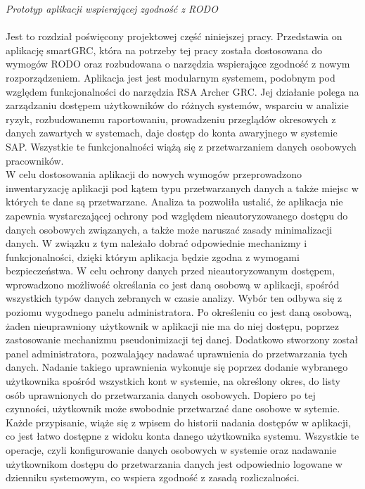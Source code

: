 \documentclass[en, noamssymb]{mgr}
\begin{document}
\indent \textit{Prototyp aplikacji wspierającej zgodność z RODO} \\ \\
\indent Jest to rozdział poświęcony projektowej część niniejszej pracy. Przedstawia on aplikację smartGRC, która na potrzeby tej pracy została dostosowana do wymogów RODO oraz rozbudowana o narzędzia wspierające zgodność z nowym rozporządzeniem. Aplikacja jest jest modularnym systemem, podobnym pod względem funkcjonalności do narzędzia RSA Archer GRC. Jej działanie polega na zarządzaniu dostępem użytkowników do różnych systemów, wsparciu w analizie ryzyk, rozbudowanemu raportowaniu, prowadzeniu przeglądów okresowych z danych zawartych w systemach, daje dostęp do konta awaryjnego w systemie SAP. Wszystkie te funkcjonalności wiążą się z przetwarzaniem danych osobowych pracowników. \\
\indent W celu dostosowania aplikacji do nowych wymogów przeprowadzono inwentaryzację aplikacji pod kątem typu przetwarzanych danych a także miejsc w których te dane są przetwarzane. Analiza ta pozwoliła ustalić, że aplikacja nie zapewnia wystarczającej ochrony pod względem nieautoryzowanego dostępu do danych osobowych związanych, a także może naruszać zasady minimalizacji danych. W związku z tym należało dobrać odpowiednie mechanizmy i funkcjonalności, dzięki którym aplikacja będzie zgodna z wymogami bezpieczeństwa. W celu ochrony danych przed nieautoryzowanym dostępem, wprowadzono możliwość określania co jest daną osobową w aplikacji, spośród wszystkich typów danych zebranych w czasie analizy. Wybór ten odbywa się z poziomu wygodnego panelu administratora. Po określeniu co jest daną osobową, żaden nieuprawniony użytkownik w aplikacji nie ma do niej dostępu, poprzez zastosowanie mechanizmu pseudonimizacji tej danej. Dodatkowo stworzony został panel administratora, pozwalający nadawać uprawnienia do przetwarzania tych danych. Nadanie takiego uprawnienia wykonuje się poprzez dodanie wybranego użytkownika spośród wszystkich kont w systemie, na określony okres, do listy osób uprawnionych do przetwarzania danych osobowych. Dopiero po tej czynności, użytkownik może swobodnie przetwarzać dane osobowe w sytemie. Każde przypisanie, wiąże się z wpisem do historii nadania dostępów w aplikacji, co jest łatwo dostępne z widoku konta danego użytkownika systemu. Wszystkie te operacje, czyli konfigurowanie danych osobowych w systemie oraz nadawanie użytkownikom dostępu do przetwarzania danych jest odpowiednio logowane w dzienniku systemowym, co wspiera zgodność z zasadą rozliczalności.\\
\end{document}
